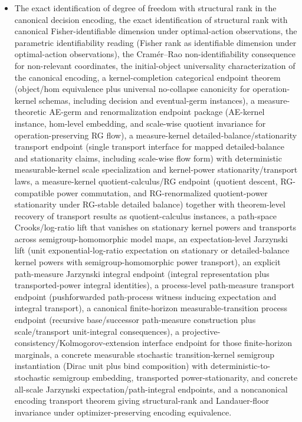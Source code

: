 \begin{itemize}
\item The exact identification of degree of freedom with structural rank in the canonical decision encoding, the exact identification of structural rank with canonical Fisher-identifiable dimension under optimal-action observations, the parametric identifiability reading (Fisher rank as identifiable dimension under optimal-action observations), the Cram\'er--Rao non-identifiability consequence for non-relevant coordinates, the initial-object universality characterization of the canonical encoding, a kernel-completion categorical endpoint theorem (object/hom equivalence plus universal no-collapse canonicity for operation-kernel schemas, including decision and eventual-germ instances), a measure-theoretic AE-germ and renormalization endpoint package (AE-kernel instance, hom-level embedding, and scale-wise quotient invariance for operation-preserving RG flow), a measure-kernel detailed-balance/stationarity transport endpoint (single transport interface for mapped detailed-balance and stationarity claims, including scale-wise flow form) with deterministic measurable-kernel scale specialization and kernel-power stationarity/transport laws, a measure-kernel quotient-calculus/RG endpoint (quotient descent, RG-compatible power commutation, and RG-renormalized quotient-power stationarity under RG-stable detailed balance) together with theorem-level recovery of transport results as quotient-calculus instances, a path-space Crooks/log-ratio lift that vanishes on stationary kernel powers and transports across semigroup-homomorphic model maps, an expectation-level Jarzynski lift (unit exponential-log-ratio expectation on stationary or detailed-balance kernel powers with semigroup-homomorphic power transport), an explicit path-measure Jarzynski integral endpoint (integral representation plus transported-power integral identities), a process-level path-measure transport endpoint (pushforwarded path-process witness inducing expectation and integral transport), a canonical finite-horizon measurable-transition process endpoint (recursive base/successor path-measure construction plus scale/transport unit-integral consequences), a projective-consistency/Kolmogorov-extension interface endpoint for those finite-horizon marginals, a concrete measurable stochastic transition-kernel semigroup instantiation (Dirac unit plus bind composition) with deterministic-to-stochastic semigroup embedding, transported power-stationarity, and concrete all-scale Jarzynski expectation/path-integral endpoints, and a noncanonical encoding transport theorem giving structural-rank and Landauer-floor invariance under optimizer-preserving encoding equivalence.

\end{itemize}
